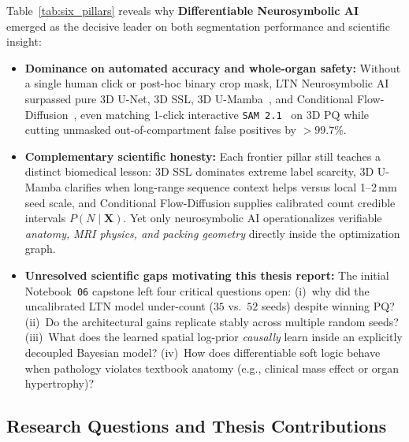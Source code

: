 \documentclass[10pt,a4paper]{article}
\renewcommand{\_}{\origunderscore\allowbreak}
\begin{document}
Table~\ref{tab:six_pillars} reveals why \textbf{Differentiable Neurosymbolic AI}~\cite{garcez2023neurosymbolic,badreddine2022ltn,xu2018semanticloss} emerged as the decisive leader on both segmentation performance and scientific insight:
\begin{itemize}
    \item \textbf{Dominance on automated accuracy and whole-organ safety:} Without a single human click or post-hoc binary crop mask, LTN Neurosymbolic AI surpassed pure 3D U-Net, 3D SSL, 3D U-Mamba~\cite{ma2024umamba,xing2024segmamba}, and Conditional Flow-Diffusion~\cite{rahman2023cimd,wu2024medsegdiff,liu2023rectifiedflow}, even matching 1-click interactive \texttt{SAM~2.1}~\cite{ravi2024sam2} on 3D $\text{PQ}$ while cutting unmasked out-of-compartment false positives by $>99.7\%$.
    \item \textbf{Complementary scientific honesty:} Each frontier pillar still teaches a distinct biomedical lesson: 3D SSL dominates extreme label scarcity, 3D U-Mamba clarifies when long-range sequence context helps versus local 1--2\,mm seed scale, and Conditional Flow-Diffusion supplies calibrated count credible intervals $P(N \mid \mathbf{X})$. Yet only neurosymbolic AI operationalizes verifiable \emph{anatomy, MRI physics, and packing geometry} directly inside the optimization graph.
    \item \textbf{Unresolved scientific gaps motivating this thesis report:} The initial Notebook~\texttt{06} capstone left four critical questions open: (i)~why did the uncalibrated LTN model under-count ($35$ vs.\ $52$ seeds) despite winning $\text{PQ}$? (ii)~Do the architectural gains replicate stably across multiple random seeds? (iii)~What does the learned spatial log-prior \emph{causally} learn inside an explicitly decoupled Bayesian model? (iv)~How does differentiable soft logic behave when pathology violates textbook anatomy (e.g., clinical mass effect or organ hypertrophy)?
\end{itemize}

\subsection{Research Questions and Thesis Contributions}
\end{document}
